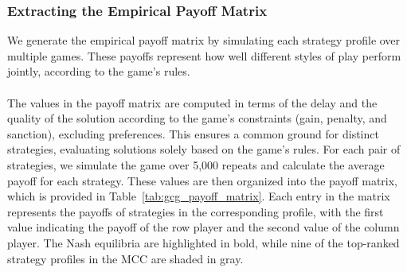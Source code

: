 \begin{flushleft}
    \subsubsection{Extracting the Empirical Payoff Matrix}

    \begin{flushleft}

        We generate the empirical payoff matrix by simulating each strategy profile over multiple games. These payoffs represent how well different styles of play perform jointly, according to the game’s rules.\\~\\

        The values in the payoff matrix are computed in terms of the delay and the quality of the solution according to the game's constraints (gain, penalty, and sanction), excluding preferences. This ensures a common ground for distinct strategies, evaluating solutions solely based on the game's rules. For each pair of strategies, we simulate the game over 5,000 repeats and calculate the average payoff for each strategy. These values are then organized into the payoff matrix, which is provided in Table~\ref{tab:gcg_payoff_matrix}. Each entry in the matrix represents the payoffs of strategies in the corresponding profile, with the first value indicating the payoff of the row player and the second value of the column player. The Nash equilibria are highlighted in bold, while nine of the top-ranked strategy profiles in the MCC are shaded in gray.\\~\\
        \begin{table}[h!]
            \centering
\end{table}
\end{flushleft}
\end{flushleft}
